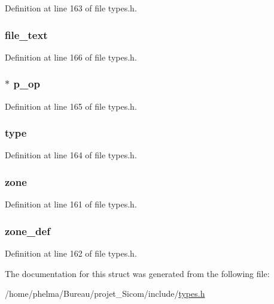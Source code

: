 Definition at line 163 of file types.\-h.

\hypertarget{struct__realoc___a70b00fb5dc5e9b0b072a72dbe243a8f1}{
\subsubsection[{file\-\_\-text}]{ file\-\_\-text}}\label{struct__realoc___a70b00fb5dc5e9b0b072a72dbe243a8f1}


Definition at line 166 of file types.\-h.

\hypertarget{struct__realoc___ac5417b27354bd5623a8b5869c23bfe1c}{
\subsubsection[{p\-\_\-op}]{$\ast$ p\-\_\-op}}\label{struct__realoc___ac5417b27354bd5623a8b5869c23bfe1c}


Definition at line 165 of file types.\-h.

\hypertarget{struct__realoc___ab48aff16626535d3a6e1af121e232797}{
\subsubsection[{type}]{ type}}\label{struct__realoc___ab48aff16626535d3a6e1af121e232797}


Definition at line 164 of file types.\-h.

\hypertarget{struct__realoc___a6a70ab3aecc26de50260bd4e04c43c9b}{
\subsubsection[{zone}]{ zone}}\label{struct__realoc___a6a70ab3aecc26de50260bd4e04c43c9b}


Definition at line 161 of file types.\-h.

\hypertarget{struct__realoc___a3a3c25f44514d114fd68d7abbcf4bbd0}{
\subsubsection[{zone\-\_\-def}]{ zone\-\_\-def}}\label{struct__realoc___a3a3c25f44514d114fd68d7abbcf4bbd0}


Definition at line 162 of file types.\-h.



The documentation for this struct was generated from the following file\-:\begin{DoxyCompactItemize}
\item 
/home/phelma/\-Bureau/projet\-\_\-\-Sicom/include/\hyperlink{types_8h}{types.\-h}\end{DoxyCompactItemize}
